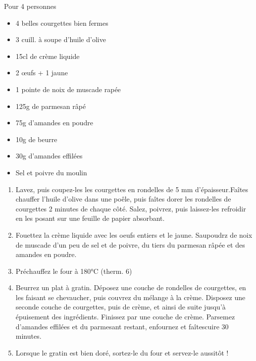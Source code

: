 \bigskip
{}
{Pour 4 personnes}{\begin{itemize}
	\item 4 belles courgettes bien fermes
	\item 3 cuill. à soupe d'huile d'olive
	\item 15cl de crème liquide
	\item 2 \oe ufs + 1 jaune
	\item 1 pointe de noix de muscade rapée
	\item 125g de parmesan râpé
	\item 75g d'amandes en poudre
	\item 10g de beurre
	\item 30g d'amandes effilées
	\item Sel et poivre du moulin
\end{itemize}}
{\begin{enumerate}
	\item Lavez, puis coupez-les les courgettes en rondelles de 5 mm d'épaisseur.Faîtes chauffer l'huile d'olive dans une poêle, puis faîtes dorer les rondelles de courgettes 2 minutes de chaque côté. Salez, poivrez, puis laissez-les refroidir en les posant sur une feuille de papier absorbant.
	\item Fouettez la crème liquide avec les oeufs entiers et le jaune. Saupoudrz de noix de muscade d'un peu de sel et de poivre, du tiers du parmesan râpée et des amandes en poudre. 
	\item Préchauffez le four à 180°C (therm. 6)
	\item Beurrez un plat à gratin. Déposez une couche de rondelles de courgettes, en les faisant se chevaucher, puis couvrez du mélange à la crème. Disposez une seconde couche de courgettes, puis de crème, et ainsi de suite jusqu'à épuisement des ingrédients. Finissez par une couche de crème. Parsemez d'amandes effilées et du parmesant restant, enfournez et faîtescuire 30 minutes.
	\item Lorsque le gratin est bien doré, sortez-le du four et servez-le aussitôt !
\end{enumerate}}


